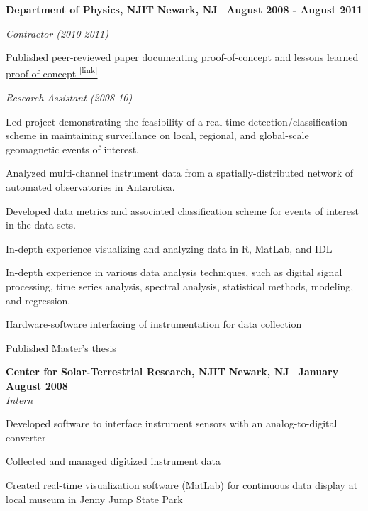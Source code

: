 \documentclass[10pt]{article}
\newcommand{\leftandright}[2]{\noindent\textbf{#1}\hfill
\textbf{#2}}
\begin{document}
\leftandright{Department of Physics, NJIT}{Newark, NJ \textbullet\, 
August 2008 - August 2011} \par
\noindent\textit{Contractor (2010-2011)} 
\vspace{-0.8em}
\begin{itemize*}
  \item Published peer-reviewed paper documenting proof-of-concept and 
    lessons learned
    \href{http://onlinelibrary.wiley.com/doi/10.1029/2011SW000688/full}
    {proof-of-concept \textsuperscript{\tiny{[link]}}}
\end{itemize*}
\vspace{-0.8em}
\textit{Research Assistant (2008-10)}
\vspace{-0.8em}
\begin{itemize*}
  \item Led project demonstrating the feasibility of a real-time
    detection/classification scheme in maintaining surveillance on
    local, regional, and global-scale geomagnetic events of interest.
  \item
    Analyzed multi-channel instrument data from a spatially-distributed
    network of automated observatories in Antarctica.
  \item Developed data metrics and associated classification scheme for
    events of interest in the data sets.
  \item In-depth experience visualizing and analyzing data in R, MatLab,
    and IDL
  \item In-depth experience in various data analysis techniques,
    such as digital signal processing, time series analysis, spectral analysis,
    statistical methods, modeling, and regression.
  \item Hardware-software interfacing of instrumentation for data
    collection
  \item Published Master's thesis
\end{itemize*}



\leftandright{Center for Solar-Terrestrial Research, NJIT}{Newark, NJ
\textbullet\, January -- August 2008}\\  
\vspace{-0.8em}
\textit{Intern}
\begin{itemize*}
  \item Developed software to interface instrument sensors with an
    analog-to-digital converter
  \item Collected and managed digitized instrument data
  \item Created real-time visualization software (MatLab) for continuous data display
    at local museum in Jenny Jump State Park
\end{itemize*}
\end{document}
